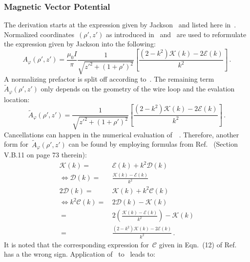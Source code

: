 \subsubsection{Magnetic Vector Potential}
The derivation starts at the expression given by Jackson~\cite{jackson}
and listed here in~.
Normalized coordinates~$(\rho', z')$ as introduced in~ and~
are used to reformulate the expression given by Jackson into the following:
\begin{equation}
 A_\varphi(\rho', z')
   = \frac{\mu_0 I}{\pi}
     \frac{1}{\sqrt{z'^2 + (1 + \rho')^2}}
     \left[ \frac{(2 - k^2)\mathcal{K}(k) - 2 \mathcal{E}(k)}{k^2} \right] \, . \label{eqn:cwl_A_phi_initial}
\end{equation}
A normalizing prefactor is split off according to~.
The remaining term~$\tilde{A}_\varphi(\rho',z')$ only depends on the geometry of the wire loop
and the evalation location:
\begin{equation}
  \tilde{A}_\varphi(\rho', z')
  = \frac{1}{\sqrt{z'^2 + (1 + \rho')^2}}
    \left[ \frac{(2 - k^2)\mathcal{K}(k) - 2 \mathcal{E}(k)}{k^2} \right] \, . \label{eqn:aNormJackson}
\end{equation}
Cancellations can happen in the numerical evaluation of~~\cite{bulirsch_3}.
Therefore, another form for~$\tilde{A}_\varphi(\rho',z')$ can be found by employing
formulas from Ref.~\cite{jahnke_emde} (Section V.B.11 on page 73 therein):
\begin{align}
                 \mathcal{K}(k) =&\, \mathcal{E}(k) + k^2 \mathcal{D}(k) \nonumber \\
 \Leftrightarrow \mathcal{D}(k) =&\, \frac{\mathcal{K}(k) - \mathcal{E}(k)}{k^2} \\
               2 \mathcal{D}(k) =&\, \mathcal{K}(k) + k^2 \mathcal{C}(k) \nonumber \\
 \Leftrightarrow k^2 \mathcal{C}(k) =&\, 2 \mathcal{D}(k) - \mathcal{K}(k) \nonumber \\
                     ~              =&\, 2 \left( \frac{\mathcal{K}(k) - \mathcal{E}(k)}{k^2} \right) - \mathcal{K}(k) \nonumber \\
                     ~              =&\, \frac{(2 - k^2) \mathcal{K}(k) - 2 \mathcal{E}(k)}{k^2} \, . \label{eqn:kSqC}
\end{align}
It is noted that the corresponding expression for~$\mathcal{C}$ given in Eqn.~(12) of Ref.~\cite{walstrom_2017}
has a the wrong sign.
Application of~ to~ leads to:

